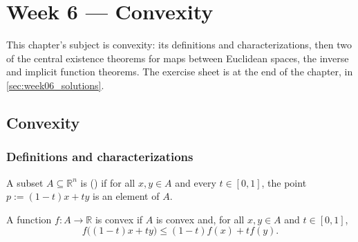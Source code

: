 \chapter{Week 6 --- Convexity}

This chapter's subject is convexity: its definitions and characterizations, then two of the
central existence theorems for maps between Euclidean spaces, the inverse and implicit function
theorems. The exercise sheet is at the end of the chapter, in \cref{sec:week06_solutions}.

\section{Convexity}
\label{sec:convexity}

\subsection{Definitions and characterizations}

\begin{definition}
\label{def:convex_set_function}
A subset $A \subseteq \mathbb{R}^n$ is  () if for all
$x,y \in A$ and every $t \in [0,1]$, the point $p := (1-t)x+ty$ is an element of $A$.

A function $f : A \to \mathbb{R}$ is convex if $A$ is convex and, for all $x,y \in A$ and
$t \in [0,1]$,
\[f\big((1-t)x+ty\big) \leq (1-t)f(x)+tf(y).\]
\end{definition}


